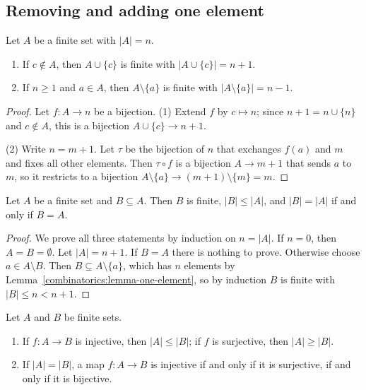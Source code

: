 \subsection{Removing and adding one element}\label{combinatorics:subsection-one-element}

\begin{lemma}\label{combinatorics:lemma-one-element}
Let $A$ be a finite set with $|A| = n$.
\begin{enumerate}
\item If $c \notin A$, then $A \cup \{c\}$ is finite with $|A \cup \{c\}| = n + 1$.
\item If $n \geq 1$ and $a \in A$, then $A \setminus \{a\}$ is finite with $|A \setminus \{a\}| = n - 1$.
\end{enumerate}
\end{lemma}

\begin{proof}
Let $f \colon A \to n$ be a bijection. (1) Extend $f$ by $c \mapsto n$; since $n + 1 = n \cup \{n\}$ and $c \notin A$, this is a bijection $A \cup \{c\} \to n + 1$.

(2) Write $n = m + 1$. Let $\tau$ be the bijection of $n$ that exchanges $f(a)$ and $m$ and fixes all other elements. Then $\tau \circ f$ is a bijection $A \to m + 1$ that sends $a$ to $m$, so it
restricts to a bijection $A \setminus \{a\} \to (m + 1) \setminus \{m\} = m$.
\end{proof}

\begin{proposition}\label{combinatorics:proposition-subsets-finite}
Let $A$ be a finite set and $B \subseteq A$. Then $B$ is finite, $|B| \leq |A|$, and $|B| = |A|$ if and only if $B = A$.
\end{proposition}

\begin{proof}
We prove all three statements by induction on $n = |A|$. If $n = 0$, then $A = B = \emptyset$. Let $|A| = n + 1$. If $B = A$ there is nothing to prove. Otherwise choose $a \in A \setminus B$. Then
$B \subseteq A \setminus \{a\}$, which has $n$ elements by Lemma~\ref{combinatorics:lemma-one-element}, so by induction $B$ is finite with $|B| \leq n < n + 1$.
\end{proof}

\begin{corollary}\label{combinatorics:corollary-injective-surjective}
Let $A$ and $B$ be finite sets.
\begin{enumerate}
\item If $f \colon A \to B$ is injective, then $|A| \leq |B|$; if $f$ is surjective, then $|A| \geq |B|$.
\item If $|A| = |B|$, a map $f \colon A \to B$ is injective if and only if it is surjective, if and only if it is bijective.
\end{enumerate}
\end{corollary}

